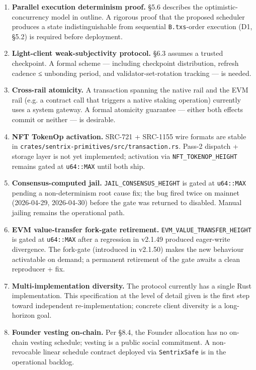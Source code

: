 \documentclass[11pt,a4paper]{article}
\providecommand{\tightlist}{\setlength{\itemsep}{0pt}\setlength{\parskip}{0pt}}
\begin{document}
\begin{enumerate}
\def\labelenumi{\arabic{enumi}.}
\tightlist
\item
  \textbf{Parallel execution determinism proof.} §5.6 describes the
  optimistic-concurrency model in outline. A rigorous proof that the
  proposed scheduler produces a state indistinguishable from sequential
  \texttt{B.txs}-order execution (D1, §5.2) is required before
  deployment.
\item
  \textbf{Light-client weak-subjectivity protocol.} §6.3 assumes a
  trusted checkpoint. A formal scheme --- including checkpoint
  distribution, refresh cadence ≤ unbonding period, and
  validator-set-rotation tracking --- is needed.
\item
  \textbf{Cross-rail atomicity.} A transaction spanning the native rail
  and the EVM rail (e.g. a contract call that triggers a native staking
  operation) currently uses a system gateway. A formal atomicity
  guarantee --- either both effects commit or neither --- is desirable.
\item
  \textbf{NFT TokenOp activation.} SRC-721 + SRC-1155 wire formats are
  stable in \texttt{crates/sentrix-primitives/src/transaction.rs}.
  Pass-2 dispatch + storage layer is not yet implemented; activation via
  \texttt{NFT\_TOKENOP\_HEIGHT} remains gated at \texttt{u64::MAX} until
  both ship.
\item
  \textbf{Consensus-computed jail.} \texttt{JAIL\_CONSENSUS\_HEIGHT} is
  gated at \texttt{u64::MAX} pending a non-determinism root cause fix;
  the bug fired twice on mainnet (2026-04-29, 2026-04-30) before the
  gate was returned to disabled. Manual jailing remains the operational
  path.
\item
  \textbf{EVM value-transfer fork-gate retirement.}
  \texttt{EVM\_VALUE\_TRANSFER\_HEIGHT} is gated at \texttt{u64::MAX}
  after a regression in v2.1.49 produced eager-write divergence. The
  fork-gate (introduced in v2.1.50) makes the new behaviour activatable
  on demand; a permanent retirement of the gate awaits a clean
  reproducer + fix.
\item
  \textbf{Multi-implementation diversity.} The protocol currently has a
  single Rust implementation. This specification at the level of detail
  given is the first step toward independent re-implementation; concrete
  client diversity is a long-horizon goal.
\item
  \textbf{Founder vesting on-chain.} Per §8.4, the Founder allocation
  has no on-chain vesting schedule; vesting is a public social
  commitment. A non-revocable linear schedule contract deployed via
  \texttt{SentrixSafe} is in the operational backlog.
\end{enumerate}
\end{document}
